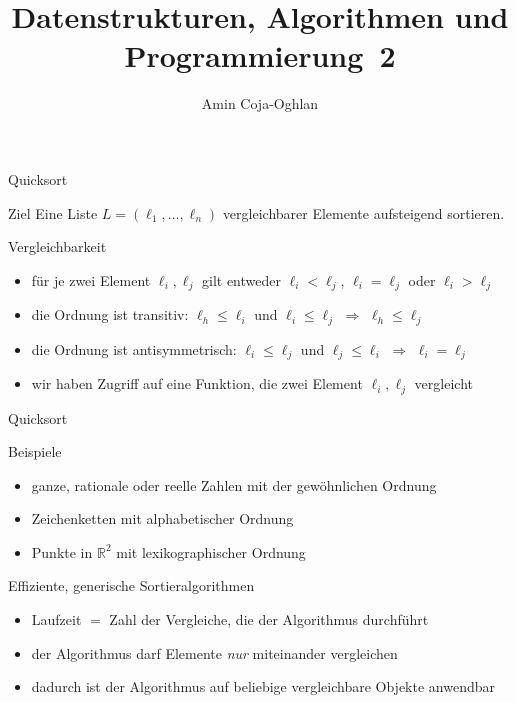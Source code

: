 \documentclass[aspectratio=1610, 11pt]{beamer}
\title{Datenstrukturen, Algorithmen und Programmierung~2}
\author[A.~Coja-Oghlan]{Amin Coja-Oghlan}
\institute[DAP2]{Lehrstuhl Informatik 2\\Fakult\"at f\"ur Informatik}
\newcommand\RR{\mathbb R}
\begin{document}
\maketitle

\begin{frame}{Quicksort}
	\begin{block}{Ziel}
			Eine Liste $L=(\ell_1,\ldots,\ell_n)$ \alert{vergleichbarer} Elemente aufsteigend sortieren.
	\end{block}
\begin{exampleblock}{Vergleichbarkeit}
	\begin{itemize}
		\item f\"ur je zwei Element $\ell_i,\ell_j$ gilt entweder $\ell_i<\ell_j$, $\ell_i=\ell_j$ oder $\ell_i>\ell_j$
		\item die Ordnung ist \alert{transitiv}: $\ell_h\leq\ell_i$ und $\ell_i\leq\ell_j$ $\Rightarrow$ $\ell_h\leq\ell_j$
	\item die Ordnung ist \alert{antisymmetrisch}: $\ell_i\leq\ell_j$ und $\ell_j\leq\ell_i$ $\Rightarrow$ $\ell_i=\ell_j$
	\item wir haben Zugriff auf eine Funktion, die zwei Element $\ell_i,\ell_j$ vergleicht
	\end{itemize}
	\end{exampleblock}
\end{frame}

\begin{frame}{Quicksort}
\begin{exampleblock}{Beispiele}
	\begin{itemize}
		\item ganze, rationale oder reelle Zahlen mit der gew\"ohnlichen Ordnung
		\item Zeichenketten mit alphabetischer Ordnung
		\item Punkte in $\RR^2$ mit lexikographischer Ordnung
	\end{itemize}
\end{exampleblock}
\begin{exampleblock}{Effiziente, generische Sortieralgorithmen}
	\begin{itemize}
		\item Laufzeit $=$ Zahl der \alert{Vergleiche}, die der Algorithmus durchf\"uhrt
		\item der Algorithmus darf Elemente \emph{nur} miteinander vergleichen
		\item dadurch ist der Algorithmus auf beliebige vergleichbare Objekte anwendbar
	\end{itemize}
\end{exampleblock}
\end{frame}
\end{document}
